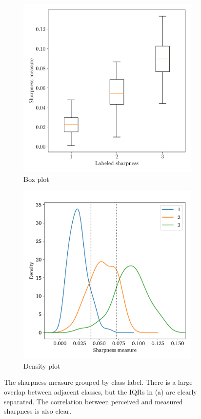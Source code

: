 \begin{figure}[htbp]
  \centering
  \begin{subfigure}[t]{0.49\textwidth}
    \centering
    \includegraphics[width=\textwidth]{figs/box.pdf}
    \caption{Box plot}\label{fig:sharpness-box}
\end{subfigure}%
\hfill
\begin{subfigure}[t]{0.48\textwidth}
  \centering
  \includegraphics[width=\textwidth]{figs/qden.pdf}
  \caption{Density plot}\label{fig:sharpness-qden}
\end{subfigure}
  \caption[Sharpness measure separability]{The sharpness measure grouped by class label. There is a large overlap between adjacent classes, but the IQRs in (a) are clearly separated. The correlation between perceived and measured sharpness is also clear.}\label{fig:sharpness}
\end{figure}

